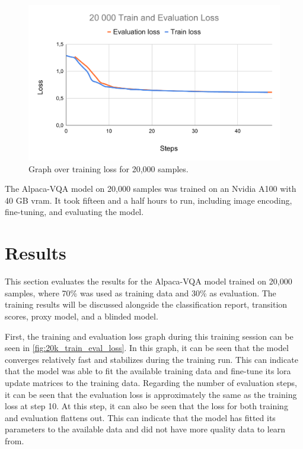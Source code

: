     \begin{figure}[htb]
        \centerline{
        \includegraphics[width=1.07\textwidth]{images/20k_train_evaluation_loss}}
        \caption{Graph over training loss for 20,000 samples.}
        \label{fig:20k_train_eval_loss}
    \end{figure} 
    
    The Alpaca-VQA model on 20,000 samples was trained on an Nvidia A100 with 40 GB \gls{vram}. It took fifteen and a half hours to run, including image encoding, fine-tuning, and evaluating the model. 



    \section{Results}
    \label{sec4:results}
    This section evaluates the results for the Alpaca-VQA model trained on 20,000 samples, where 70\% was used as training data and 30\% as evaluation. The training results will be discussed alongside the classification report, transition scores, proxy model, and a blinded model.
    
    First, the training and evaluation loss graph during this training session can be seen in \autoref{fig:20k_train_eval_loss}. In this graph, it can be seen that the model converges relatively fast and stabilizes during the training run. This can indicate that the model was able to fit the available training data and fine-tune its \gls{lora} update matrices to the training data. Regarding the number of evaluation steps, it can be seen that the evaluation loss is approximately the same as the training loss at step 10. At this step, it can also be seen that the loss for both training and evaluation flattens out. This can indicate that the model has fitted its parameters to the available data and did not have more quality data to learn from. 


